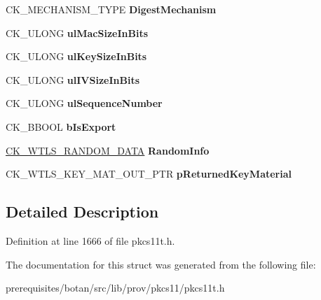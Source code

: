 \begin{DoxyCompactItemize}
\item 
\mbox{\label{struct_c_k___w_t_l_s___k_e_y___m_a_t___p_a_r_a_m_s_aea2b231b8552ac86c6dc0434b0502e2b}} 
C\+K\+\_\+\+M\+E\+C\+H\+A\+N\+I\+S\+M\+\_\+\+T\+Y\+PE {\bfseries Digest\+Mechanism}
\item 
\mbox{\label{struct_c_k___w_t_l_s___k_e_y___m_a_t___p_a_r_a_m_s_aa4891256daf5ff764421a7b967b525b9}} 
C\+K\+\_\+\+U\+L\+O\+NG {\bfseries ul\+Mac\+Size\+In\+Bits}
\item 
\mbox{\label{struct_c_k___w_t_l_s___k_e_y___m_a_t___p_a_r_a_m_s_a1fd499c0edb2cd4fd1877301e554ffd7}} 
C\+K\+\_\+\+U\+L\+O\+NG {\bfseries ul\+Key\+Size\+In\+Bits}
\item 
\mbox{\label{struct_c_k___w_t_l_s___k_e_y___m_a_t___p_a_r_a_m_s_a37e7d3d8619b180e6b0e6442006b2f43}} 
C\+K\+\_\+\+U\+L\+O\+NG {\bfseries ul\+I\+V\+Size\+In\+Bits}
\item 
\mbox{\label{struct_c_k___w_t_l_s___k_e_y___m_a_t___p_a_r_a_m_s_aa0827a5a42d3e3679898636dee382c59}} 
C\+K\+\_\+\+U\+L\+O\+NG {\bfseries ul\+Sequence\+Number}
\item 
\mbox{\label{struct_c_k___w_t_l_s___k_e_y___m_a_t___p_a_r_a_m_s_acac1b1ee6edf25ca628f6e1c31cd90ca}} 
C\+K\+\_\+\+B\+B\+O\+OL {\bfseries b\+Is\+Export}
\item 
\mbox{\label{struct_c_k___w_t_l_s___k_e_y___m_a_t___p_a_r_a_m_s_ac73d57990771b7c66499385866a15641}} 
\mbox{\hyperlink{struct_c_k___w_t_l_s___r_a_n_d_o_m___d_a_t_a}{C\+K\+\_\+\+W\+T\+L\+S\+\_\+\+R\+A\+N\+D\+O\+M\+\_\+\+D\+A\+TA}} {\bfseries Random\+Info}
\item 
\mbox{\label{struct_c_k___w_t_l_s___k_e_y___m_a_t___p_a_r_a_m_s_a2ce311c67e150c9a9ada167e8492db94}} 
C\+K\+\_\+\+W\+T\+L\+S\+\_\+\+K\+E\+Y\+\_\+\+M\+A\+T\+\_\+\+O\+U\+T\+\_\+\+P\+TR {\bfseries p\+Returned\+Key\+Material}
\end{DoxyCompactItemize}


\subsection{Detailed Description}


Definition at line 1666 of file pkcs11t.\+h.



The documentation for this struct was generated from the following file\+:\begin{DoxyCompactItemize}
\item 
prerequisites/botan/src/lib/prov/pkcs11/pkcs11t.\+h\end{DoxyCompactItemize}
